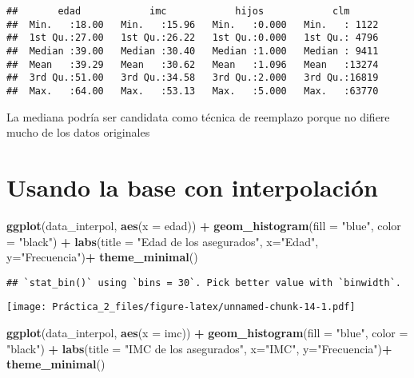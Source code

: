 \documentclass[
]{article}
\newenvironment{Shaded}{\begin{snugshade}}{\end{snugshade}}
\newcommand{\AttributeTok}[1]{\textcolor[rgb]{0.13,0.29,0.53}{#1}}
\newcommand{\FunctionTok}[1]{\textcolor[rgb]{0.13,0.29,0.53}{\textbf{#1}}}
\newcommand{\NormalTok}[1]{#1}
\newcommand{\SpecialCharTok}[1]{\textcolor[rgb]{0.81,0.36,0.00}{\textbf{#1}}}
\newcommand{\StringTok}[1]{\textcolor[rgb]{0.31,0.60,0.02}{#1}}
\begin{document}
\begin{verbatim}
##       edad            imc            hijos            clm       
##  Min.   :18.00   Min.   :15.96   Min.   :0.000   Min.   : 1122  
##  1st Qu.:27.00   1st Qu.:26.22   1st Qu.:0.000   1st Qu.: 4796  
##  Median :39.00   Median :30.40   Median :1.000   Median : 9411  
##  Mean   :39.29   Mean   :30.62   Mean   :1.096   Mean   :13274  
##  3rd Qu.:51.00   3rd Qu.:34.58   3rd Qu.:2.000   3rd Qu.:16819  
##  Max.   :64.00   Max.   :53.13   Max.   :5.000   Max.   :63770
\end{verbatim}

La mediana podría ser candidata como técnica de reemplazo porque no
difiere mucho de los datos originales

\section{Usando la base con
interpolación}\label{usando-la-base-con-interpolaciuxf3n}

\begin{Shaded}
\begin{Highlighting}[]
\FunctionTok{ggplot}\NormalTok{(data\_interpol, }\FunctionTok{aes}\NormalTok{(}\AttributeTok{x =}\NormalTok{ edad)) }\SpecialCharTok{+}
  \FunctionTok{geom\_histogram}\NormalTok{(}\AttributeTok{fill =} \StringTok{"blue"}\NormalTok{, }\AttributeTok{color =} \StringTok{"black"}\NormalTok{) }\SpecialCharTok{+}
  \FunctionTok{labs}\NormalTok{(}\AttributeTok{title =} \StringTok{"Edad de los asegurados"}\NormalTok{, }\AttributeTok{x=}\StringTok{"Edad"}\NormalTok{, }\AttributeTok{y=}\StringTok{"Frecuencia"}\NormalTok{)}\SpecialCharTok{+}
  \FunctionTok{theme\_minimal}\NormalTok{()}
\end{Highlighting}
\end{Shaded}

\begin{verbatim}
## `stat_bin()` using `bins = 30`. Pick better value with `binwidth`.
\end{verbatim}

\texttt{[image: Práctica\_2\_files/figure-latex/unnamed-chunk-14-1.pdf]}

\begin{Shaded}
\begin{Highlighting}[]
\FunctionTok{ggplot}\NormalTok{(data\_interpol, }\FunctionTok{aes}\NormalTok{(}\AttributeTok{x =}\NormalTok{ imc)) }\SpecialCharTok{+}
  \FunctionTok{geom\_histogram}\NormalTok{(}\AttributeTok{fill =} \StringTok{"blue"}\NormalTok{, }\AttributeTok{color =} \StringTok{"black"}\NormalTok{) }\SpecialCharTok{+}
  \FunctionTok{labs}\NormalTok{(}\AttributeTok{title =} \StringTok{"IMC de los asegurados"}\NormalTok{, }\AttributeTok{x=}\StringTok{"IMC"}\NormalTok{, }\AttributeTok{y=}\StringTok{"Frecuencia"}\NormalTok{)}\SpecialCharTok{+}
  \FunctionTok{theme\_minimal}\NormalTok{()}
\end{Highlighting}
\end{Shaded}
\end{document}
